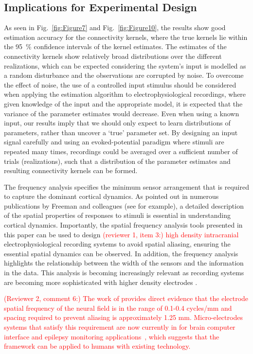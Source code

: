 \documentclass[review,authoryear,3p]{elsarticle}
\newcommand{\dean}[1]{\textcolor{red}{#1}}
\begin{document}
\subsection{Implications for Experimental Design}
As seen in Fig.~\ref{fig:Figure7} and Fig.~\ref{fig:Figure10}, the results show good estimation accuracy for the connectivity kernels, where the true kernels lie within the 95~\% confidence intervals of the kernel estimates. The estimates of the connectivity kernels show relatively broad distributions over the different realizations, which can be expected considering the system's input is modelled as a random disturbance and the observations are corrupted by noise. To overcome the effect of noise, the use of a controlled input stimulus should be considered when applying the estimation algorithm to electrophysiological recordings, where given knowledge of the input and the appropriate model, it is expected that the variance of the parameter estimates would decrease. Even when using a known input, our results imply that we should only expect to learn distributions of parameters, rather than uncover a `true' parameter set. By designing an input signal carefully and using an evoked-potential paradigm where stimuli are repeated many times, recordings could be averaged over a sufficient number of trials (realizations), such that a distribution of the parameter estimates and resulting connectivity kernels can be formed.

The frequency analysis specifies the minimum sensor arrangement that is required to capture the dominant cortical dynamics. As pointed out in numerous publications by Freeman and colleagues (see \citet{Freeman1987} for example), a detailed description of the spatial properties of responses to stimuli is essential in understanding cortical dynamics. Importantly, the spatial frequency analysis tools presented in this paper can be used to design \dean{(reviewer 1, item 3:) high density intracranial} electrophysiological recording systems to avoid spatial aliasing, ensuring the essential spatial dynamics can be observed. In addition, the frequency analysis highlights the relationship between the width of the sensors and the information in the data. This analysis is becoming increasingly relevant as recording systems are becoming more sophisticated with higher density electrodes \citep{Brinkmann2009}.

\dean{(Reviewer 2, comment 6:) The work of \citet{Freeman2000} provides direct evidence that the electrode spatial frequency of the neural field is in the range of 0.1-0.4 cycles/mm and spacing required to prevent aliasing is approximately 1.25 mm. Micro-electrodes systems that satisfy this requirement are now currently in for brain computer interface and epilepsy monitoring applications~\citep{Cheung2007}, which suggests that the framework can be applied to humans with existing technology.} 
\end{document}
